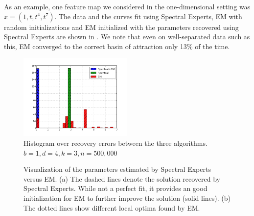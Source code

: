 As an example, one feature map we considered in the one-dimensional
setting was $x = (1, t, t^4, t^7)$. The data and the curves fit using
Spectral Experts, EM with random initializations and EM initialized with
the parameters recovered using Spectral Experts are shown in
. We note that even on well-separated data such as
this, EM converged to the correct basin of attraction only 13\% of the time.

\begin{figure}[t]
  \centering
  \includegraphics[width=0.50\textwidth]{figures/hist.png}
  \caption{Histogram over recovery errors between the three algorithms. $b = 1, d = 4, k = 3, n = 500,000$}
  \label{fig:hist}
\end{figure}


\begin{figure}[p]
  \centering
    \hspace{-2em}
  \caption{Visualization of the parameters estimated by Spectral Experts versus EM.
  (a) The dashed lines denote the solution recovered by Spectral Experts. While
  not a perfect fit, it provides an good initialization for EM to further improve the solution (solid lines).
  (b) The dotted lines show different local optima found by EM.}
  \label{fig:curves}
\end{figure}

